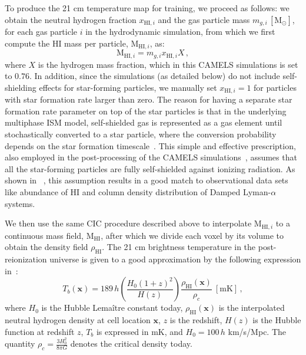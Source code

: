 To produce the 21 cm temperature map for training, we proceed as follows: {we obtain the neutral hydrogen fraction $x_{\text{HI}, i}$} and the gas particle mass $m_{g, i} \,  [\mathrm{M}_\odot]$, for each gas particle $i$ in the hydrodynamic simulation, from which we {first compute the HI mass per particle, $\mathrm{M}_{\text{HI}, i}$, as: }
{
\begin{equation}
    \mathrm{M}_{\text{HI}, i} = m_{g,i}x_{\text{HI}, i}X \, ,
\end{equation}
}
{where $X$ is the hydrogen mass fraction, which in this CAMELS simulations is set to $0.76$}. In addition, since the simulations (as detailed below) do not include self-shielding effects for star-forming particles, we manually set $x_{\text{HI}, i} = 1$ for particles with star formation rate larger than zero. {The reason for having a separate star formation rate parameter on top of the star particles is that in the underlying multiphase ISM model, self-shielded gas is represented as a gas element until stochastically converted to a star particle, where the conversion probability depends on the star formation timescale~\citep{Springel_2003}.} This simple and effective prescription, also employed in the post-processing of the CAMELS simulations~\citep{villaescusa-navarro_camels_2022}, assumes that all the star-forming particles are fully self-shielded against ionizing radiation. As shown in ~\citet{villaescusa-navarro_ingredients_2018}, this assumption results in a good match to observational data sets like abundance of HI and column density distribution of Damped Lyman-$\alpha$ systems.

We then use the same CIC procedure described above to interpolate
$\mathrm{M}_{\text{HI},i}$ to a continuous mass field, $\mathrm{M}_{\text{HI}}$, after which we divide each voxel by its volume to obtain the density field $\rho_{\mathrm{HI}}$. The 21 cm brightness temperature in the post-reionization universe is given to a good approximation by the following expression in~\citet{villaescusa-navarro_ingredients_2018}:
\begin{equation}\label{eq:tb}
    T_b(\bm{x}) = 189\,h\left(\frac{H_0(1+z)^2}{H(z)}\right)\frac{\rho_{\mathrm{HI}}(\bm{x})}{\rho_c} ~[\text{mK}]\, ,
\end{equation}
where $H_0$ is the Hubble Lemaître constant today, $\rho_{\mathrm{HI}}(\bm{x})$ is the interpolated neutral hydrogen density at cell location $\bm{x}$, $z$ is the redshift, $H(z)$ is the Hubble function at redshift $z$, $T_b$ is expressed in mK, and $H_0 = 100\,h$ km/s/Mpc. The quantity $\rho_c = \frac{3H_0^2}{8\pi G}$ denotes the critical density today.

